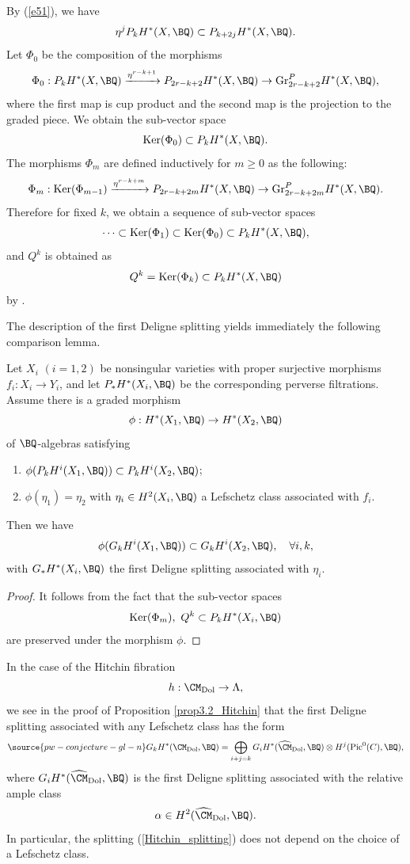 By (\ref{e51}), we have
\[
\eta^j P_k H^*(X, \BQ) \subset P_{k+2j}H^*(X, \BQ).
\]
Let $\Phi_0$ be the composition of the morphisms
\[
\Phi_0: P_kH^*(X, \BQ) \xrightarrow{\eta^{r-k+1}} P_{2r-k+2}H^*(X, \BQ) \to \mathrm{Gr}_{2r-k+2}^PH^*(X, \BQ),
\]
where the first map is cup product and the second map is the projection to the graded piece. We obtain the sub-vector space
\[
\mathrm{Ker}(\Phi_0) \subset P_kH^*(X, \BQ).
\]
The morphisms $\Phi_m$ are defined inductively for $m\geq 0$ as the following:
\[
\Phi_m: \mathrm{Ker}(\Phi_{m-1}) \xrightarrow{\eta^{r-k+m}} P_{2r-k+2m}H^*(X, \BQ) \to \mathrm{Gr}_{2r-k+2m}^PH^*(X, \BQ).
\]
Therefore for fixed $k$, we obtain a sequence of sub-vector spaces
\[
\cdots \subset \mathrm{Ker}(\Phi_1) \subset \mathrm{Ker}(\Phi_0) \subset P_kH^*(X, \BQ),
\]
and $Q^k$ is obtained as
\[
Q^k = \mathrm{Ker}(\Phi_k) \subset P_kH^*(X, \BQ)
\]
by \cite[Proposition 2.7.1]{dCM4}.

The description of the first Deligne splitting yields immediately the following comparison lemma.

\begin{lem}
\notready\label{comparison1}
Let $X_i$ $(i=1,2)$ be nonsingular varieties with proper surjective morphisms $f_i: X_i \to Y_i$, and let $P_*H^*(X_i, \BQ)$ be the corresponding perverse filtrations. Assume there is a graded morphism
\[
\phi: H^*(X_1, \BQ) \to H^*(X_2, \BQ)
\]
of $\BQ$-algebras satisfying
\begin{enumerate}
    \item[(a)] $\phi(P_kH^i(X_1, \BQ)) \subset P_kH^i(X_2, \BQ)$;
    \item[(b)] $\phi(\eta_1) = \eta_2$ with $\eta_i \in H^2(X_i, \BQ)$ a Lefschetz class associated with $f_i$.
\end{enumerate}
Then we have
\[
\phi(G_kH^i(X_1, \BQ)) \subset G_k H^i(X_2, \BQ), \quad \forall i,k,
\]
with $G_*H^*(X_i, \BQ)$ the first Deligne splitting associated with $\eta_i$.
\end{lem}

\begin{proof}
It follows from the fact that the sub-vector spaces
\[
\mathrm{Ker}(\Phi_m), ~ Q^k \subset P_kH^*(X_i, \BQ)
\]
are preserved under the morphism $\phi$.
\end{proof}

\begin{rmk}
\notready
In the case of the Hitchin fibration
\[
h: \CM_{\mathrm{Dol}} \to  \Lambda,
\]
we see in the proof of Proposition \ref{prop3.2_Hitchin} that the first Deligne splitting associated with any Lefschetz class has the form
\begin{equation}\label{Hitchin_splitting}
\source{pw-conjecture-gl-n}
G_k H^*(\CM_{\mathrm{Dol}}, \BQ) = \bigoplus_{i+j=k} G_iH^*(\widehat{\CM}_{\mathrm{Dol}}, \BQ) \otimes H^j(\mathrm{Pic}^0(C), \BQ),
\end{equation}
where $G_iH^*(\widehat{\CM}_{\mathrm{Dol}}, \BQ)$ is the first Deligne splitting associated with the relative ample class
\[
\alpha \in H^2(\widehat{\CM}_{\mathrm{Dol}}, \BQ).
\]
In particular, the splitting (\ref{Hitchin_splitting}) does not depend on the choice of a Lefschetz class.
\end{rmk}

